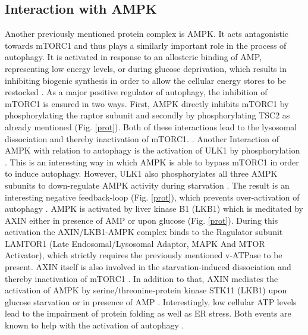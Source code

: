 \documentclass[12pt]{article} %
\begin{document}
\begin{linenumbers*}


\subsection{Interaction with AMPK}
Another previously mentioned protein complex is AMPK. It acts antagonistic towards mTORC1 and thus plays a similarly important role in the process of autophagy. It is activated in response to an allosteric binding of AMP, representing low energy levels, or during glucose deprivation, which results in inhibiting biogenic synthesis in order to allow the cellular energy stores to be restocked \citep{Huang2008, RabanalRuiz2018}.
As a major positive regulator of autophagy, the inhibition of mTORC1 is ensured in two ways. First, AMPK directly inhibits mTORC1 by phosphorylating the raptor subunit and secondly by phosphorylating TSC2 as already mentioned (Fig. \ref{prot}). Both of these interactions lead to the lysosomal dissociation and thereby inactivation of mTORC1.
\citep{RabanalRuiz2017, Mercer2018, Carroll2017}.
Another Interaction of AMPK with relation to autophagy is the activation of ULK1 by phosphorylation . This is an interesting way in which AMPK is able to bypass mTORC1 in order to induce autophagy. However, ULK1 also phosphorylates all three AMPK subunits to down-regulate AMPK activity during starvation . The result is an interesting negative feedback-loop (Fig. \ref{prot}), which prevents over-activation of autophagy \citep{Mercer2018, Carroll2017}.
AMPK is activated by liver kinase B1 (LKB1) which is meditated by AXIN either in presence of AMP or upon glucose  (Fig. \ref{prot}).
During this activation the AXIN/LKB1-AMPK complex binds to the Ragulator subunit LAMTOR1 (Late Endosomal/Lysosomal Adaptor, MAPK And MTOR Activator), which strictly requires the previously mentioned v-ATPase to be present. AXIN itself is also involved in the starvation-induced dissociation and thereby inactivation of mTORC1 \citep{RabanalRuiz2018, Shafei2017, Carroll2017}.
In addition to that, AXIN mediates the activation of AMPK by serine/threonine-protein kinase STK11 (LKB1) upon glucose starvation or in presence of AMP \citep{Dikic2018, Carroll2017}.
Interestingly, low cellular ATP levels lead to the impairment of protein folding as well as ER stress. Both events are known to help with the activation of autophagy \citep{RabanalRuiz2018}.


\end{linenumbers*}
\end{document}

